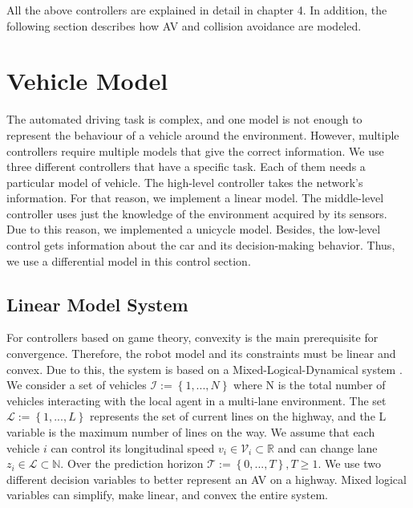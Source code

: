All the above controllers are explained in detail in chapter 4. In addition, the following section describes how AV and collision avoidance are modeled. 






\section{Vehicle Model}

The automated driving task is complex, and one model is not enough to represent the behaviour of a vehicle around the environment. However, multiple controllers require multiple models that give the correct information. We use three different controllers that have a specific task. Each of them needs a particular model of vehicle. The high-level controller takes the network's information. For that reason, we implement a linear model. The middle-level controller uses just the knowledge of the environment acquired by its sensors. Due to this reason, we implemented a unicycle model. Besides, the low-level control gets information about the car and its decision-making behavior. Thus, we use a differential model in this control section. 


\subsection{Linear Model System}
\label{linear_model_system}

For controllers based on game theory, convexity is the main prerequisite for convergence. Therefore, the robot model and its constraints must be linear and convex. Due to this, the system is based on a Mixed-Logical-Dynamical system \cite{BEMPORAD1999407}. We consider a set of vehicles $\mathcal{I}:= \left \{ 1, ..., N \right \}$ where N is the total number of vehicles interacting with the local agent in a multi-lane environment. The set  $\mathcal{L}:= \left \{ 1, ..., L \right \}$ represents the set of current lines on the highway, and the L variable is the maximum number of lines on the way. We assume that each vehicle $i$ can control its longitudinal speed $v_i \in \mathcal{V}_i \subset \mathbb{R}$  and can change lane $z_i \in \mathcal{L} \subset \mathbb{N}$. Over the prediction horizon $\mathcal{T} := \left \{ 0, ... ,T \right \} , T\geq 1$. We use two different decision variables to better represent an AV on a highway. Mixed logical variables can simplify, make linear, and convex the entire system. 

